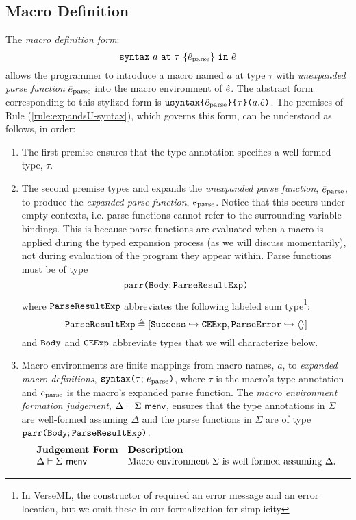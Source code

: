\subsection{Macro Definition}
The \emph{macro definition form}: $$\texttt{syntax}~a~\texttt{at}~\tau~\{\hat{e}_\text{parse}\}~\texttt{in}~\hat{e}$$ allows the programmer to introduce a {macro} named $a$ at type $\tau$ with \emph{unexpanded parse function} $\hat{e}_\text{parse}$ into the macro environment of $\hat{e}$. The abstract form corresponding to this stylized form is $\texttt{usyntax}\texttt{\{}\hat{e}_\text{parse}\texttt{\}\{}\tau\texttt{\}(}a.\hat{e}\texttt{)}$. 
The premises of Rule (\ref{rule:expandsU-syntax}), which governs this form, can be understood as follows, in order:
\begin{enumerate}
\item The first premise ensures that the type annotation specifies a well-formed type, $\tau$.
\item The second premise types and expands the \emph{unexpanded parse function}, $\hat{e}_\text{parse}$, to produce the \emph{expanded parse function}, $e_\text{parse}$. Notice that this occurs under empty contexts, i.e. parse functions cannot refer to the surrounding variable bindings. This is because parse functions are evaluated when a macro is applied during the typed expansion process (as we will discuss momentarily), not during evaluation of the program they appear within. Parse functions must be of type \[\texttt{parr}\texttt{(}\mathtt{Body}; \mathtt{ParseResultExp}\texttt{)}\] where 
$\mathtt{ParseResultExp}$ abbreviates the following labeled sum type\footnote{In VerseML, the  constructor of  required an error message and an error location, but we omit these in our formalization for simplicity}:
\[
\mathtt{ParseResultExp} \triangleq [\mathtt{Success} \hookrightarrow \mathtt{CEExp}, \mathtt{ParseError} \hookrightarrow \langle  \rangle]
\] and 
 $\mathtt{Body}$ and $\mathtt{CEExp}$ abbreviate types that we will characterize below. 
\item Macro environments are finite mappings from macro names, $a$, to \emph{expanded macro definitions}, $\texttt{syntax}\texttt{(}\tau;\,e_\text{parse}\texttt{)}$, where $\tau$ is the macro's {type annotation} and $e_\text{parse}$ is the macro's {expanded parse function}. The \emph{macro environment formation judgement}, $\Delta \vdash \Sigma~\mathsf{menv}$, ensures that the type annotations in $\Sigma$ are well-formed assuming $\Delta$ and the parse functions in $\Sigma$ are  of type $\texttt{parr}\texttt{(}\mathtt{Body}; \mathtt{ParseResultExp}\texttt{)}$.
\[\begin{array}{ll}
\textbf{Judgement Form} & \textbf{Description}\\
\Delta \vdash \Sigma~\mathsf{menv} & \text{Macro environment $\Sigma$ is well-formed assuming $\Delta$.}\end{array}\]

\end{enumerate}
